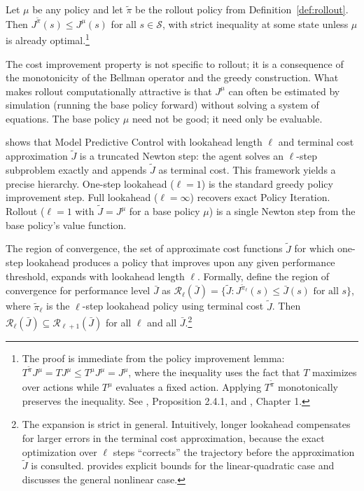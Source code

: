 \begin{theorem}
\label{thm:cost_improvement}
Let $\mu$ be any policy and let $\tilde{\pi}$ be the rollout policy from Definition~\ref{def:rollout}. Then $J^{\tilde{\pi}}(s) \leq J^\mu(s)$ for all $s \in \mathcal{S}$, with strict inequality at some state unless $\mu$ is already optimal.\footnote{The proof is immediate from the policy improvement lemma: $T^{\tilde{\pi}} J^\mu = T J^\mu \leq T^\mu J^\mu = J^\mu$, where the inequality uses the fact that $T$ maximizes over actions while $T^\mu$ evaluates a fixed action. Applying $T^{\tilde{\pi}}$ monotonically preserves the inequality. See \citet{bertsekas2022}, Proposition 2.4.1, and \citet{bertsekas2025}, Chapter 1.}
\end{theorem}

The cost improvement property is not specific to rollout; it is a consequence of the monotonicity of the Bellman operator and the greedy construction. What makes rollout computationally attractive is that $J^\mu$ can often be estimated by simulation (running the base policy forward) without solving a system of equations. The base policy $\mu$ need not be good; it need only be evaluable.

\citet{bertsekas2024} shows that Model Predictive Control with lookahead length $\ell$ and terminal cost approximation $\tilde{J}$ is a truncated Newton step: the agent solves an $\ell$-step subproblem exactly and appends $\tilde{J}$ as terminal cost. This framework yields a precise hierarchy. One-step lookahead ($\ell = 1$) is the standard greedy policy improvement step. Full lookahead ($\ell = \infty$) recovers exact Policy Iteration. Rollout ($\ell = 1$ with $\tilde{J} = J^\mu$ for a base policy $\mu$) is a single Newton step from the base policy's value function.

The region of convergence, the set of approximate cost functions $\tilde{J}$ for which one-step lookahead produces a policy that improves upon any given performance threshold, expands with lookahead length $\ell$. Formally, define the region of convergence for performance level $\bar{J}$ as $\mathcal{R}_\ell(\bar{J}) = \{\tilde{J} : J^{\tilde{\pi}_\ell}(s) \leq \bar{J}(s) \text{ for all } s\}$, where $\tilde{\pi}_\ell$ is the $\ell$-step lookahead policy using terminal cost $\tilde{J}$. Then $\mathcal{R}_\ell(\bar{J}) \subseteq \mathcal{R}_{\ell+1}(\bar{J})$ for all $\ell$ and all $\bar{J}$.\footnote{The expansion is strict in general. Intuitively, longer lookahead compensates for larger errors in the terminal cost approximation, because the exact optimization over $\ell$ steps ``corrects'' the trajectory before the approximation $\tilde{J}$ is consulted. \citet{bertsekas2024} provides explicit bounds for the linear-quadratic case and discusses the general nonlinear case.}

